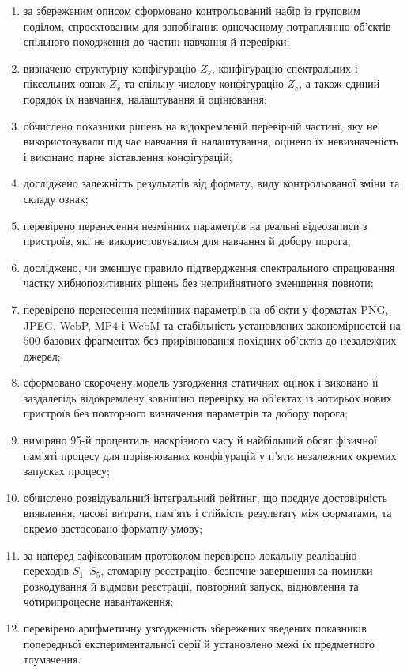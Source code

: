 \begin{enumerate}
\item за збереженим описом сформовано контрольований набір із груповим поділом, спроєктованим для запобігання одночасному потраплянню об’єктів спільного походження до частин навчання й перевірки;
\item визначено структурну конфігурацію $Z_s$, конфігурацію спектральних і піксельних ознак $Z_v$ та спільну числову конфігурацію $Z_c$, а також єдиний порядок їх навчання, налаштування й оцінювання;
\item обчислено показники рішень на відокремленій перевірній частині, яку не використовували під час навчання й налаштування, оцінено їх невизначеність і виконано парне зіставлення конфігурацій;
\item досліджено залежність результатів від формату, виду контрольованої зміни та складу ознак;
\item перевірено перенесення незмінних параметрів на реальні відеозаписи з пристроїв, які не використовувалися для навчання й добору порога;
\item досліджено, чи зменшує правило підтвердження спектрального спрацювання частку хибнопозитивних рішень без неприйнятного зменшення повноти;
\item перевірено перенесення незмінних параметрів на об’єкти у форматах PNG, JPEG, WebP, MP4 і WebM та стабільність установлених закономірностей на $500$ базових фрагментах без прирівнювання похідних об’єктів до незалежних джерел;
\item сформовано скорочену модель узгодження статичних оцінок і виконано її заздалегідь відокремлену зовнішню перевірку на об’єктах із чотирьох нових пристроїв без повторного визначення параметрів та добору порога;
\item виміряно 95-й процентиль наскрізного часу й найбільший обсяг фізичної пам’яті процесу для порівнюваних конфігурацій у п’яти незалежних окремих запусках процесу;
\item обчислено розвідувальний інтегральний рейтинг, що поєднує достовірність виявлення, часові витрати, пам’ять і стійкість результату між форматами, та окремо застосовано форматну умову;
\item за наперед зафіксованим протоколом перевірено локальну реалізацію переходів $S_1$--$S_5$, атомарну реєстрацію, безпечне завершення за помилки розкодування й відмови реєстрації, повторний запуск, відновлення та чотирипроцесне навантаження;
\item перевірено арифметичну узгодженість збережених зведених показників попередньої експериментальної серії й установлено межі їх предметного тлумачення.
\end{enumerate}


